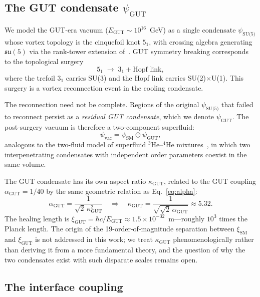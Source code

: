 \documentclass[11pt]{article}
\begin{document}
\subsection{The GUT condensate $\psi_\text{GUT}$}

We model the GUT-era vacuum ($E_\text{GUT} \sim 10^{16}$~GeV) as a single condensate $\psi_\text{SU(5)}$ whose vortex topology is the cinquefoil knot $5_1$, with crossing algebra generating $\mathfrak{su}(5)$ via the rank-tower extension of~\cite{NWT8}.
GUT symmetry breaking corresponds to the topological surgery
\begin{equation}
5_1 \;\longrightarrow\; 3_1 + \text{Hopf link},
\label{eq:GUT-surgery}
\end{equation}
where the trefoil $3_1$ carries SU(3) and the Hopf link carries SU(2)$\times$U(1).
This surgery is a vortex reconnection event in the cooling condensate.

The reconnection need not be complete.
Regions of the original $\psi_\text{SU(5)}$ that failed to reconnect persist as a \emph{residual GUT condensate}, which we denote $\psi_\text{GUT}$.
The post-surgery vacuum is therefore a two-component superfluid:
\begin{equation}
\psi_\text{vac} = \psi_\text{SM} \oplus \psi_\text{GUT},
\label{eq:two-condensate}
\end{equation}
analogous to the two-fluid model of superfluid $^3$He--$^4$He mixtures~\cite{Vollhardt1990}, in which two interpenetrating condensates with independent order parameters coexist in the same volume.

The GUT condensate has its own aspect ratio $\kappa_\text{GUT}$, related to the GUT coupling $\alpha_\text{GUT} = 1/40$ by the same geometric relation as Eq.~\eqref{eq:alpha}:
\begin{equation}
\alpha_\text{GUT} = \frac{1}{\sqrt{2}\,\kappa_\text{GUT}^2} \quad\Rightarrow\quad \kappa_\text{GUT} = \frac{1}{\sqrt{\sqrt{2}\,\alpha_\text{GUT}}} \approx 5.32.
\label{eq:kappa-GUT}
\end{equation}
The healing length is $\xi_\text{GUT} = \hbar c / E_\text{GUT} \approx 1.5 \times 10^{-32}$~m---roughly $10^3$ times the Planck length.
The origin of the 19-order-of-magnitude separation between $\xi_\text{SM}$ and $\xi_\text{GUT}$ is not addressed in this work; we treat $\kappa_\text{GUT}$ phenomenologically rather than deriving it from a more fundamental theory, and the question of why the two condensates exist with such disparate scales remains open.

\subsection{The interface coupling}
\end{document}
